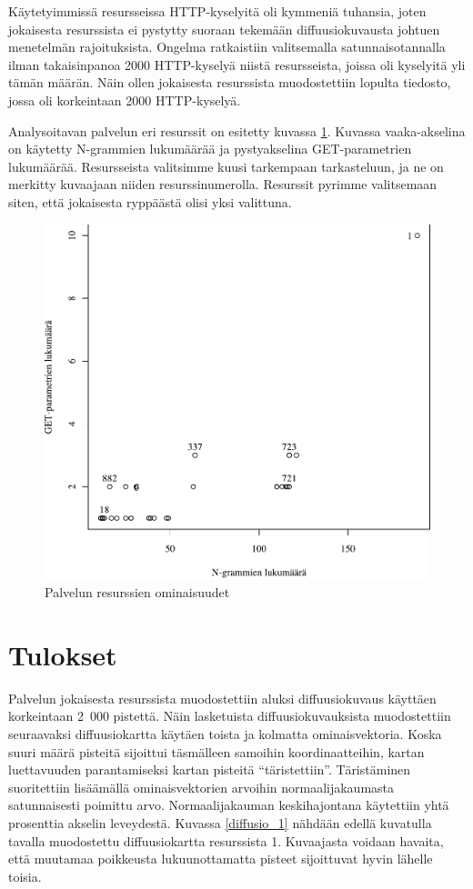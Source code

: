 Käytetyimmissä resursseissa HTTP-kyselyitä oli kymmeniä tuhansia, joten jokaisesta resurssista ei pystytty suoraan tekemään diffuusiokuvausta johtuen
menetelmän rajoituksista. Ongelma ratkaistiin valitsemalla satunnaisotannalla ilman takaisinpanoa 2000 HTTP-kyselyä niistä resursseista, joissa oli 
kyselyitä yli tämän määrän. Näin ollen jokaisesta resurssista muodostettiin lopulta tiedosto, jossa oli korkeintaan 2000 HTTP-kyselyä.

Analysoitavan palvelun eri resurssit on esitetty kuvassa \ref{service_resources}. Kuvassa vaaka-akselina on käytetty N-grammien lukumäärää ja 
pystyakselina GET-parametrien lukumäärää. Resursseista valitsimme kuusi tarkempaan tarkasteluun, ja ne on merkitty kuvaajaan niiden resurssinumerolla. 
Resurssit pyrimme valitsemaan siten, että jokaisesta ryppäästä olisi yksi valittuna.

\begin{figure}[ht]
\centering
\includegraphics[width=13cm]{pics/service_resources.pdf}
\caption{Palvelun resurssien ominaisuudet}
\label{service_resources}
\end{figure}

\section{Tulokset}

Palvelun jokaisesta resurssista muodostettiin aluksi diffuusiokuvaus
käyttäen korkeintaan 2~000 pistettä. Näin lasketuista
diffuusiokuvauksista muodostettiin seuraavaksi diffuusiokartta käytäen
toista ja kolmatta ominaisvektoria.  Koska suuri määrä pisteitä
sijoittui täsmälleen samoihin koordinaatteihin, kartan luettavuuden
parantamiseksi kartan pisteitä ``täristettiin''. Täristäminen
suoritettiin lisäämällä ominaisvektorien arvoihin normaalijakaumasta
satunnaisesti poimittu arvo. Normaalijakauman keskihajontana
käytettiin yhtä prosenttia akselin leveydestä. Kuvassa
\ref{diffusio_1} nähdään edellä kuvatulla tavalla muodostettu
diffuusiokartta resurssista 1. Kuvaajasta voidaan havaita, että
muutamaa poikkeusta lukuunottamatta pisteet sijoittuvat hyvin lähelle
toisia.

